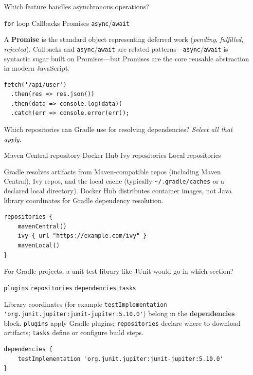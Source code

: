 \question[4]
Which feature handles asynchronous operations?
\begin{choices}
  \choice \lstinline[style=jsinline]|for| loop
  \choice Callbacks
  \CorrectChoice Promises
  \choice \lstinline[style=jsinline]|async|/\lstinline[style=jsinline]|await|
\end{choices}
\begin{solution}
  A \textbf{Promise} is the standard object representing deferred work (\emph{pending}, \emph{fulfilled}, \emph{rejected}). Callbacks and \lstinline[style=jsinline]|async|/\lstinline[style=jsinline]|await| are related patterns---\lstinline[style=jsinline]|async|/\lstinline[style=jsinline]|await| is syntactic sugar built on Promises---but Promises are the core reusable abstraction in modern JavaScript.
\begin{lstlisting}[style=js]
fetch('/api/user')
  .then(res => res.json())
  .then(data => console.log(data))
  .catch(err => console.error(err));
\end{lstlisting}
\end{solution}

\newpage


\question[4]
Which repositories can Gradle use for resolving dependencies? \emph{Select all that apply.}
\begin{checkboxes}
  \CorrectChoice Maven Central repository
  \choice Docker Hub
  \CorrectChoice Ivy repositories
  \CorrectChoice Local repositories
\end{checkboxes}
\begin{solution}
  Gradle resolves artifacts from Maven-compatible repos (including Maven Central), Ivy repos, and the local cache (typically \lstinline[style=bashinline]|~/.gradle/caches| or a declared local directory). Docker Hub distributes container images, not Java library coordinates for Gradle dependency resolution.
\begin{lstlisting}[style=java]
repositories {
    mavenCentral()
    ivy { url "https://example.com/ivy" }
    mavenLocal()
}
\end{lstlisting}
\end{solution}

\question[4]
For Gradle projects, a unit test library like JUnit would go in which section?
\begin{choices}
  \choice \texttt{plugins}
  \choice \texttt{repositories}
  \CorrectChoice \texttt{dependencies}
  \choice \texttt{tasks}
\end{choices}
\begin{solution}
  Library coordinates (for example \lstinline[style=javainline]|testImplementation 'org.junit.jupiter:junit-jupiter:5.10.0'|) belong in the \textbf{dependencies} block. \texttt{plugins} apply Gradle plugins; \texttt{repositories} declare where to download artifacts; \texttt{tasks} define or configure build steps.
\begin{lstlisting}[style=java]
dependencies {
    testImplementation 'org.junit.jupiter:junit-jupiter:5.10.0'
}
\end{lstlisting}
\end{solution}


